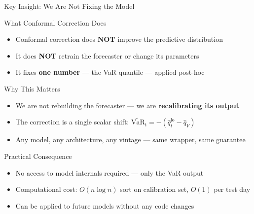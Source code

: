\documentclass[9pt, aspectratio=169, t]{beamer}
\newcommand{\VaR}{\mathrm{VaR}}
\newcommand{\qV}{\hat{q}_V}
\begin{document}
\begin{frame}{Key Insight: We Are Not Fixing the Model}
	\vspace{-0.3cm}
	{\footnotesize
	\begin{block}{What Conformal Correction Does}
		\begin{itemize}\setlength{\itemsep}{1pt}
			\item Conformal correction does \textbf{NOT} improve the predictive distribution
			\item It does \textbf{NOT} retrain the forecaster or change its parameters
			\item It fixes \textbf{one number} --- the VaR quantile --- applied post-hoc
		\end{itemize}
	\end{block}
	\vspace{0mm}
	\begin{exampleblock}{Why This Matters}
		\begin{itemize}\setlength{\itemsep}{1pt}
			\item We are not rebuilding the forecaster --- we are \textbf{recalibrating its output}
			\item The correction is a single scalar shift: $\widetilde{\VaR}_t = -(\hat{q}_t^{\mathrm{lo}} - \qV)$
			\item Any model, any architecture, any vintage --- same wrapper, same guarantee
		\end{itemize}
	\end{exampleblock}
	\vspace{0mm}
	\begin{block}{Practical Consequence}
		\begin{itemize}\setlength{\itemsep}{1pt}
			\item No access to model internals required --- only the VaR output
			\item Computational cost: $O(n \log n)$ sort on calibration set, $O(1)$ per test day
			\item Can be applied to future models without any code changes
		\end{itemize}
	\end{block}
	}
\end{frame}
\end{document}
